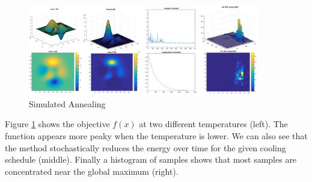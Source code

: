 \begin{figure}[tbhp]
    \centering
    \includegraphics[width=0.9\textwidth, trim={10 10 10 10}]{figures/sim_annealing_merged.png}
    \caption{Simulated Annealing}
    \label{fig:sim_annealing_merged}
\end{figure}

Figure \ref{fig:sim_annealing_merged} shows the objective $f(x)$ at two different temperatures (left). The function appears more peaky when the temperature is lower. We can also see that the method stochastically reduces the energy over time for the given cooling schedule (middle). Finally a histogram of samples shows that most samples are concentrated near the global maximum (right).




